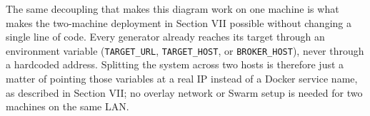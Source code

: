 The same decoupling that makes this diagram work on one machine is what makes
the two-machine deployment in Section VII possible without changing a single
line of code. Every generator already reaches its target through an
environment variable (\texttt{TARGET\_URL}, \texttt{TARGET\_HOST}, or
\texttt{BROKER\_HOST}), never through a hardcoded address. Splitting the
system across two hosts is therefore just a matter of pointing those
variables at a real IP instead of a Docker service name, as described in
Section VII; no overlay network or Swarm setup is needed for two machines on
the same LAN.
